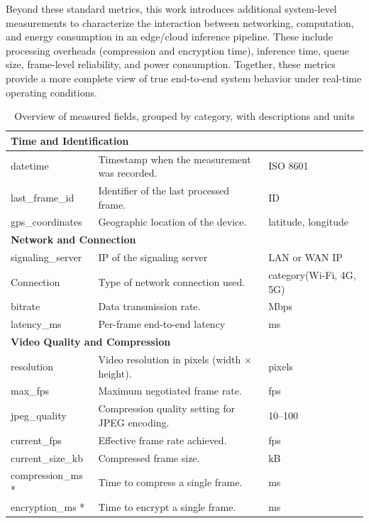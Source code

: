 \documentclass{ieeeaccess}
\begin{document}
Beyond these standard metrics, this work introduces additional system-level measurements to characterize the interaction between networking, computation, and energy consumption in an edge/cloud inference pipeline. These include processing overheads (compression and encryption time), inference time, queue size, frame-level reliability, and power consumption. Together, these metrics provide a more complete view of true end-to-end system behavior under real-time operating conditions.


\begin{table}[h!]
\centering
\caption{Overview of measured fields, grouped by category, with descriptions and units}
\label{tab:metrics}
\begin{tabular}{|l|p{2.5cm}|l|}
\hline
\multicolumn{3}{|l|}{\textbf{Time and Identification}} \\ \hline
datetime & Timestamp when the measurement was recorded. & ISO 8601 \\ \hline
last\_frame\_id & Identifier of the last processed frame. & ID \\ \hline
gps\_coordinates & Geographic location of the device. & latitude, longitude \\ \hline

\multicolumn{3}{|l|}{\textbf{Network and Connection}} \\ \hline
signaling\_server & IP of the signaling server & LAN or WAN IP \\ \hline
Connection & Type of network connection used. & category(Wi-Fi, 4G, 5G) \\ \hline
bitrate & Data transmission rate. & Mbps \\ \hline
latency\_ms & Per-frame end-to-end latency & ms \\ \hline

\multicolumn{3}{|l|}{\textbf{Video Quality and Compression}} \\ \hline
resolution & Video resolution in pixels (width × height). & pixels \\ \hline
max\_fps & Maximum negotiated frame rate. & fps \\ \hline
jpeg\_quality & Compression quality setting for JPEG encoding. & 10--100 \\ \hline
current\_fps & Effective frame rate achieved. & fps \\ \hline
current\_size\_kb & Compressed frame size. & kB \\ \hline
compression\_ms * & Time to compress a single frame. & ms \\ \hline
encryption\_ms * & Time to encrypt a single frame. & ms \\ \hline


\end{tabular}
\end{table}
\end{document}
